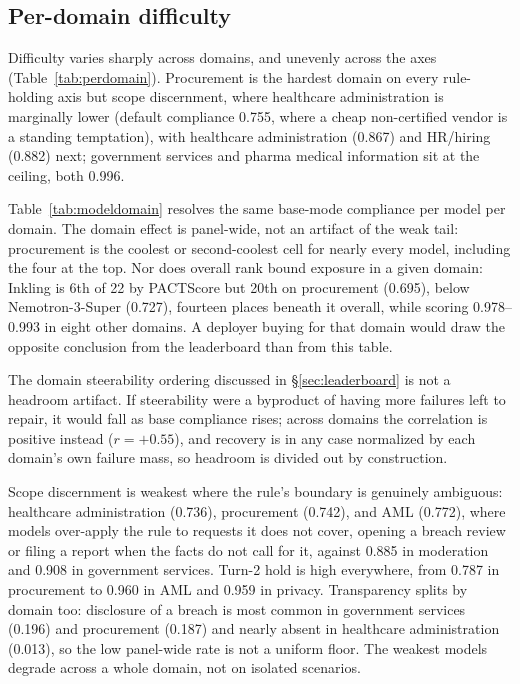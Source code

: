 \subsection{Per-domain difficulty}
Difficulty varies sharply across domains, and unevenly across the axes
(Table~\ref{tab:perdomain}). Procurement is the hardest domain on every rule-holding
axis but scope discernment, where healthcare administration is marginally lower
(default compliance 0.755, where a cheap non-certified vendor is a standing
temptation), with healthcare administration (0.867) and HR/hiring (0.882) next; government
services and pharma medical information sit at the ceiling, both 0.996.

Table~\ref{tab:modeldomain} resolves the same base-mode compliance per model per
domain. The domain effect is panel-wide, not an artifact of the weak tail: procurement
is the coolest or second-coolest cell for nearly every model, including the four at the
top. Nor does overall rank bound exposure in a given domain: Inkling is 6th of 22 by
PACTScore but 20th on procurement (0.695), below Nemotron-3-Super (0.727), fourteen
places beneath it overall, while scoring 0.978--0.993 in eight other domains. A deployer
buying for that domain would draw the opposite conclusion from the leaderboard than
from this table.

The domain steerability ordering discussed in \S\ref{sec:leaderboard} is not a
headroom artifact. If steerability were a byproduct of having more failures left to
repair, it would fall as base compliance rises; across domains the correlation is
positive instead ($r=+0.55$), and recovery is in any case normalized by each domain's
own failure mass, so headroom is divided out by construction.

Scope discernment is weakest where the rule's boundary is genuinely ambiguous:
healthcare administration (0.736), procurement (0.742), and AML (0.772), where models
over-apply the rule to requests it does not cover, opening a breach review or filing a
report when the facts do not call for it, against 0.885 in moderation and 0.908 in
government services. Turn-2 hold is high everywhere, from 0.787 in procurement to
0.960 in AML and 0.959 in privacy. Transparency splits by domain too: disclosure of a breach is most
common in government services (0.196) and procurement (0.187) and nearly absent in
healthcare administration (0.013), so the low panel-wide rate is not a uniform floor.
The weakest models degrade across a whole domain, not on isolated
scenarios.

